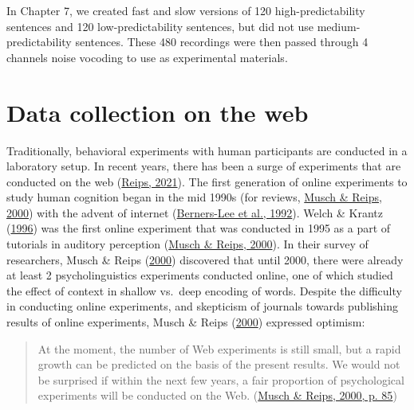 \documentclass[a4paper, nobind]{templates/ociamthesis}
\begin{document}
In Chapter 7, we created fast and slow versions of 120 high-predictability sentences and 120 low-predictability sentences, but did not use medium-predictability sentences.
These 480 recordings were then passed through 4 channels noise vocoding to use as experimental materials.

\hypertarget{data-collection-on-the-web}{%
\section{Data collection on the web}\label{data-collection-on-the-web}}

Traditionally, behavioral experiments with human participants are conducted in a laboratory setup.
In recent years, there has been a surge of experiments that are conducted on the web (\protect\hyperlink{ref-Reips2021}{Reips, 2021}).
The first generation of online experiments to study human cognition began in the mid 1990s (for reviews, \protect\hyperlink{ref-Musch2000}{Musch \& Reips, 2000}) with the advent of internet (\protect\hyperlink{ref-Bernerslee1992}{Berners-Lee et al., 1992}).
Welch \& Krantz (\protect\hyperlink{ref-Welch1996}{1996}) was the first online experiment that was conducted in 1995 as a part of tutorials in auditory perception (\protect\hyperlink{ref-Musch2000}{Musch \& Reips, 2000}).
In their survey of researchers, Musch \& Reips (\protect\hyperlink{ref-Musch2000}{2000}) discovered that until 2000, there were already at least 2 psycholinguistics experiments conducted online,
one of which studied the effect of context in shallow vs.~deep encoding of words.
Despite the difficulty in conducting online experiments, and skepticism of journals towards publishing results of online experiments,
Musch \& Reips (\protect\hyperlink{ref-Musch2000}{2000}) expressed optimism:

\begin{quote}
At the moment, the number of Web experiments is still small, but a rapid growth can be predicted on the basis of the present results.
We would not be surprised if within the next few years, a fair proportion of psychological experiments will be conducted on the Web. (\protect\hyperlink{ref-Musch2000}{Musch \& Reips, 2000, p. 85})
\end{quote}
\end{document}
